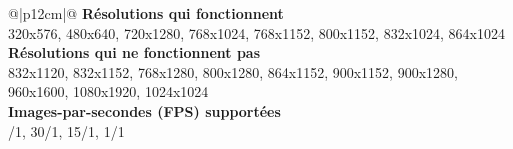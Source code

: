 {
    \renewcommand*{\arraystretch}{1.4}
    \begin{table}[ht]
    \centering
    \caption{Résolutions et images-par-seconde (FPS) testés}\label{table:resolutions_tested}
    \vspace{0.3em} %
    \begin{tabular}{{@{}|p{12cm}|@{}}}
         \hline
         \textbf{Résolutions qui fonctionnent}\\
         \hline
        320x576, 480x640, 720x1280, 768x1024, 768x1152, 800x1152, 832x1024, 864x1024\\
        \hline
        \textbf{Résolutions qui ne fonctionnent pas}\\
        \hline
        832x1120, 832x1152, 768x1280, 800x1280, 864x1152, 900x1152, 900x1280, 960x1600, 1080x1920, 1024x1024\\
        \hline
        \textbf{Images-par-secondes (FPS) supportées}\\
        /1, 30/1, 15/1, 1/1\\
        \hline
    \end{tabular}
    \end{table}
}